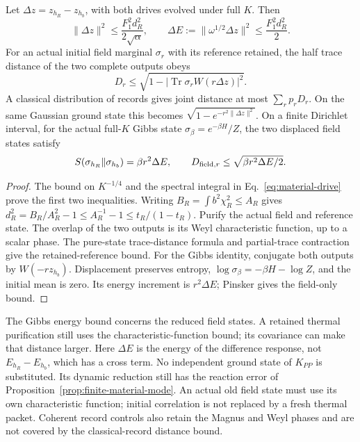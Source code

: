 \begin{proposition}
\label{prop:local-material-actuation}
Let $\Delta z=z_{h_R}-z_{h_b}$, with both drives evolved under full $K$.
Then
\[
 \|\Delta z\|^2\le\frac{F_1^2d_R^2}{2\sqrt\alpha},\qquad
 \Delta E:=\|\omega^{1/2}\Delta z\|^2
                         \le\frac{F_1^2d_R^2}{2}.
\]
For an actual initial field marginal $\sigma_r$ with its reference
retained, the half trace distance of the two complete outputs obeys
\[
 D_r\le\sqrt{1-|\operatorname{Tr}\sigma_r W(r\Delta z)|^2}.
\]
A classical distribution of records gives joint distance at most
$\sum_r p_rD_r$. On the same Gaussian ground state this becomes
$\sqrt{1-e^{-r^2\|\Delta z\|^2}}$.
On a finite Dirichlet interval, for the actual full-$K$ Gibbs state
$\sigma_\beta=e^{-\beta H}/Z$, the two displaced field states satisfy
\[
 S(\sigma_{h_R}\|\sigma_{h_b})=\beta r^2\Delta E,
 \qquad D_{{\rm field},r}\le\sqrt{\beta r^2\Delta E/2}.
\]
\end{proposition}
\begin{proof}
The bound on $K^{-1/4}$ and the spectral integral in
Eq.~\eqref{eq:material-drive} prove the first two inequalities.
Writing $B_R=\int b^2\chi_R^2\le A_R$ gives
$d_R^2=B_R/A_R^2-1\le A_R^{-1}-1\le t_R/(1-t_R)$.
Purify the actual field and reference state. The overlap of the two
outputs is its Weyl characteristic function, up to a scalar phase.
The pure-state trace-distance formula and partial-trace contraction
give the retained-reference bound. For the Gibbs identity, conjugate
both outputs by $W(-rz_{h_b})$. Displacement preserves entropy,
$\log\sigma_\beta=-\beta H-\log Z$, and the initial mean is zero.
Its energy increment is $r^2\Delta E$; Pinsker gives the field-only bound.
\end{proof}

The Gibbs energy bound concerns the reduced field states. A retained
thermal purification still uses the characteristic-function bound;
its covariance can make that distance larger.
Here $\Delta E$ is the energy of the difference response, not
$E_{h_R}-E_{h_b}$, which has a cross term. No independent ground state
of $K_{PP}$ is substituted. Its dynamic reduction still has the
reaction error of Proposition~\ref{prop:finite-material-mode}.
An actual old field state must use its own characteristic function;
initial correlation is not replaced by a fresh thermal packet.
Coherent record controls also retain the Magnus and Weyl phases and
are not covered by the classical-record distance bound.

